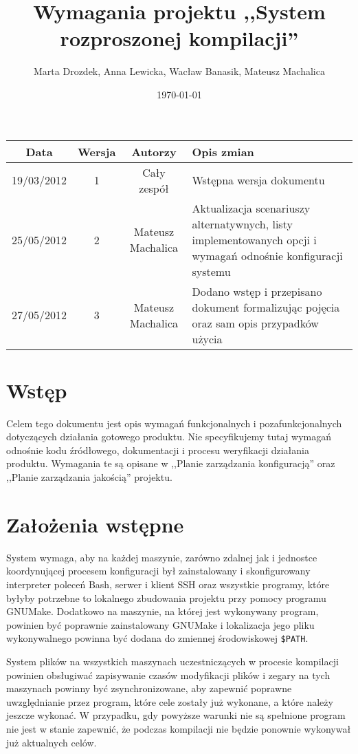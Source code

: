 \documentclass[a4paper]{article}
\title{Wymagania projektu ,,System rozproszonej kompilacji''}
\author{Marta Drozdek, Anna Lewicka, Wacław Banasik, Mateusz Machalica}
\date{\today}
\begin{document}
\maketitle

\begin{table}[!h]
	\centering
	\begin{tabular}{|c|c|c|p{8cm}|}
		\hline
		\textbf{Data} & \textbf{Wersja} & \textbf{Autorzy} & \textbf{Opis zmian} \\ \hline
		19/03/2012 & 1 & Cały zespół & Wstępna wersja dokumentu \\ \hline
		25/05/2012 & 2 & Mateusz Machalica & Aktualizacja scenariuszy alternatywnych, listy implementowanych opcji i wymagań odnośnie konfiguracji systemu \\ \hline
		27/05/2012 & 3 & Mateusz Machalica & Dodano wstęp i przepisano dokument formalizując pojęcia oraz sam opis przypadków użycia \\ \hline
	\end{tabular}
\end{table}

\section{Wstęp}

Celem tego dokumentu jest opis wymagań funkcjonalnych i pozafunkcjonalnych dotyczących działania gotowego produktu.
Nie specyfikujemy tutaj wymagań odnośnie kodu źródłowego, dokumentacji i procesu weryfikacji działania produktu. Wymagania te są opisane w ,,Planie zarządzania konfiguracją'' oraz ,,Planie zarządzania jakością'' projektu.



\section{Założenia wstępne}

System wymaga, aby na każdej maszynie, zarówno zdalnej jak i jednostce koordynującej procesem konfiguracji był zainstalowany i skonfigurowany interpreter poleceń Bash, serwer i klient SSH oraz wszystkie programy, które byłyby potrzebne to lokalnego zbudowania projektu przy pomocy programu GNUMake.
Dodatkowo na maszynie, na której jest wykonywany program, powinien być poprawnie zainstalowany GNUMake i lokalizacja jego pliku wykonywalnego powinna być dodana do zmiennej środowiskowej \verb+$PATH+.

System plików na wszystkich maszynach uczestniczących w procesie kompilacji powinien obsługiwać zapisywanie czasów modyfikacji plików i zegary na tych maszynach powinny być zsynchronizowane, aby zapewnić poprawne uwzględnianie przez program, które cele zostały już wykonane, a które należy jeszcze wykonać.
W przypadku, gdy powyższe warunki nie są spełnione program nie jest w stanie zapewnić, że podczas kompilacji nie będzie ponownie wykonywał już aktualnych celów.
\end{document}
